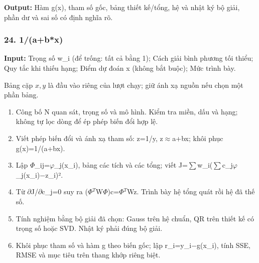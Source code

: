 \textbf{Output:} Hàm g(\allowbreak{}x),\allowbreak{} tham số gốc,\allowbreak{} bảng thiết kế/\allowbreak{}tổng,\allowbreak{} hệ và nhật ký bộ giải,\allowbreak{} phần dư và sai số có định nghĩa rõ.

\examplebreak\subsubsection*{24. 1/\allowbreak{}(\allowbreak{}a+\allowbreak{}b*x)}

\textbf{Input:} Trọng số w\_i (\allowbreak{}để trống: tất cả bằng 1);\allowbreak{} Cách giải bình phương tối thiểu;\allowbreak{} Quy tắc khi thiếu hạng;\allowbreak{} Điểm dự đoán x (\allowbreak{}không bắt buộc);\allowbreak{} Mức trình bày.

Bảng cặp $x,y$ là đầu vào riêng của lượt chạy; giữ ánh xạ nguồn nếu chọn một phần bảng.

\begin{enumerate}

\item Công bố N quan sát,\allowbreak{} trọng số và mô hình. Kiểm tra miền,\allowbreak{} dấu và hạng;\allowbreak{} không tự lọc dòng để ép phép biến đổi hợp lệ.

\item Viết phép biến đổi và ánh xạ tham số: z=\allowbreak{}1/\allowbreak{}y,\allowbreak{} z\ensuremath{\approx}a+\allowbreak{}bx;\allowbreak{} khôi phục g(\allowbreak{}x)=\allowbreak{}1/\allowbreak{}(\allowbreak{}a+\allowbreak{}bx).

\item Lập \ensuremath{\Phi}\_ij=\allowbreak{}\ensuremath{\varphi}\_j(\allowbreak{}x\_i),\allowbreak{} bảng các tích và các tổng;\allowbreak{} viết J=\allowbreak{}\ensuremath{\sum}w\_i(\allowbreak{}\ensuremath{\sum}c\_j\ensuremath{\varphi}\_j(\allowbreak{}x\_i)\ensuremath{-}z\_i)².

\item Từ \ensuremath{\partial}J/\allowbreak{}\ensuremath{\partial}c\_j=\allowbreak{}0 suy ra (\allowbreak{}\ensuremath{\Phi}\ensuremath{{}^T}W\ensuremath{\Phi})c=\allowbreak{}\ensuremath{\Phi}\ensuremath{{}^T}Wz. Trình bày hệ tổng quát rồi hệ đã thế số.

\item Tính nghiệm bằng bộ giải đã chọn: Gauss trên hệ chuẩn,\allowbreak{} QR trên thiết kế có trọng số hoặc SVD. Nhật ký phải đúng bộ giải.

\item Khôi phục tham số và hàm g theo biến gốc;\allowbreak{} lập r\_i=\allowbreak{}y\_i\ensuremath{-}g(\allowbreak{}x\_i),\allowbreak{} tính SSE,\allowbreak{} RMSE và mục tiêu trên thang khớp riêng biệt.

\end{enumerate}

